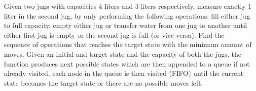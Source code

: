 \documentclass[11pt]{ipu-ai}
\begin{document}
    \maketitle
    

    {Given two jugs with capacities 4 liters and 3 liters respectively, measure exactly 1 liter in the
    second jug, by only performing the following operations: fill either jug to full capacity, empty either jug or
    transfer water from one jug to another until either first jug is empty or the second jug is full (or vice versa).
    Find the sequence of operations that reaches the target state with the minimum amount of moves.}%
    {Given an initial and target state and the capacity of both the jugs, the  function
    produces next possible states which are then appended to a queue if not already visited, each node in the queue is
    then visited (FIFO) until the current state becomes the target state or there are no possible moves left.}\\%
\end{document}
